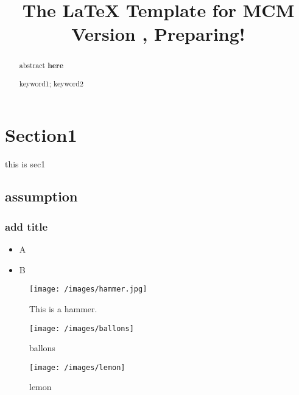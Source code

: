 \documentclass{mcmthesis} %
\title{The \LaTeX{} Template for MCM Version \MCMversion, Preparing!} %
\begin{document}

\begin{abstract} %
    abstract\textbf{ here}  %
     
\begin{keywords} %
    keyword1; keyword2
\end{keywords}

\end{abstract}
\maketitle 


\section{Section1}

this is sec1


\subsection{assumption}
\subsubsection{add title}

\begin{itemize}
	\item A
	\item B
\end{itemize}

\begin{figure}[ht]
\centering
\texttt{[image: /images/hammer.jpg]}
\caption{This is a hammer.}
\label{fugure 1}
\end{figure}

\begin{figure}[htbp]
	\centering
	\begin{minipage}[ht]{0.48\textwidth}
		\centering
		\texttt{[image: /images/ballons]}
		\label{fig_22}
		\caption{ballons}
	\end{minipage}
	\begin{minipage}[ht]{0.48\textwidth}
		\centering
		\texttt{[image: /images/lemon]}
		\caption{lemon}
		\label{fig_23}
	\end{minipage}
\end{figure}
\end{document}
